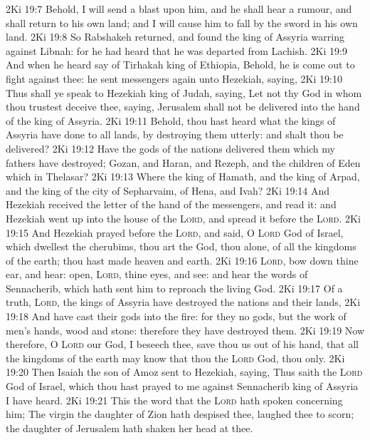 \vs 2Ki 19:7 Behold, I will send a blast upon him, and he shall hear a rumour, and shall return to his own land; and I will cause him to fall by the sword in his own land.
\vs 2Ki 19:8 So Rabshakeh returned, and found the king of Assyria warring against Libnah: for he had heard that he was departed from Lachish.
\vs 2Ki 19:9 And when he heard say of Tirhakah king of Ethiopia, Behold, he is come out to fight against thee: he sent messengers again unto Hezekiah, saying,
\vs 2Ki 19:10 Thus shall ye speak to Hezekiah king of Judah, saying, Let not thy God in whom thou trustest deceive thee, saying, Jerusalem shall not be delivered into the hand of the king of Assyria.
\vs 2Ki 19:11 Behold, thou hast heard what the kings of Assyria have done to all lands, by destroying them utterly: and shalt thou be delivered?
\vs 2Ki 19:12 Have the gods of the nations delivered them which my fathers have destroyed;  Gozan, and Haran, and Rezeph, and the children of Eden which  in Thelasar?
\vs 2Ki 19:13 Where  the king of Hamath, and the king of Arpad, and the king of the city of Sepharvaim, of Hena, and Ivah?
\vs 2Ki 19:14 And Hezekiah received the letter of the hand of the messengers, and read it: and Hezekiah went up into the house of the \textsc{Lord}, and spread it before the \textsc{Lord}.
\vs 2Ki 19:15 And Hezekiah prayed before the \textsc{Lord}, and said, O \textsc{Lord} God of Israel, which dwellest  the cherubims, thou art the God,  thou alone, of all the kingdoms of the earth; thou hast made heaven and earth.
\vs 2Ki 19:16 \textsc{Lord}, bow down thine ear, and hear: open, \textsc{Lord}, thine eyes, and see: and hear the words of Sennacherib, which hath sent him to reproach the living God.
\vs 2Ki 19:17 Of a truth, \textsc{Lord}, the kings of Assyria have destroyed the nations and their lands,
\vs 2Ki 19:18 And have cast their gods into the fire: for they  no gods, but the work of men's hands, wood and stone: therefore they have destroyed them.
\vs 2Ki 19:19 Now therefore, O \textsc{Lord} our God, I beseech thee, save thou us out of his hand, that all the kingdoms of the earth may know that thou  the \textsc{Lord} God,  thou only.
\vs 2Ki 19:20 Then Isaiah the son of Amoz sent to Hezekiah, saying, Thus saith the \textsc{Lord} God of Israel,  which thou hast prayed to me against Sennacherib king of Assyria I have heard.
\vs 2Ki 19:21 This  the word that the \textsc{Lord} hath spoken concerning him; The virgin the daughter of Zion hath despised thee,  laughed thee to scorn; the daughter of Jerusalem hath shaken her head at thee.
